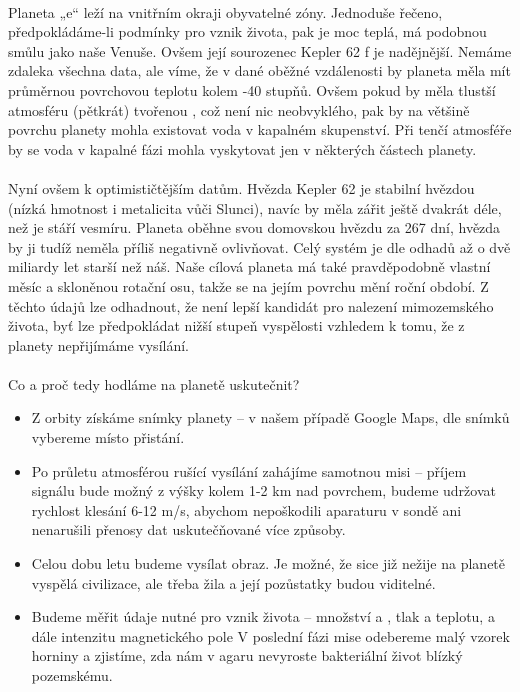 \documentclass[a4paper]{report}
\begin{document}
\paragraph{} Planeta „e“ leží na vnitřním okraji obyvatelné zóny. Jednoduše řečeno, předpokládáme-li podmínky pro vznik života, pak je moc teplá, má podobnou smůlu jako naše Venuše. Ovšem její sourozenec Kepler 62 f je nadějnější. Nemáme zdaleka všechna data, ale víme, že v dané oběžné vzdálenosti by planeta měla mít průměrnou povrchovou teplotu kolem -40 stupňů. Ovšem pokud by měla tlustší atmosféru (pětkrát) tvořenou , což není nic neobvyklého, pak by na většině povrchu planety mohla existovat voda v kapalném skupenství. Při tenčí atmosféře by se voda v kapalné fázi mohla vyskytovat jen v některých částech planety.
\paragraph{} Nyní ovšem k optimističtějším datům. Hvězda Kepler 62 je stabilní hvězdou (nízká hmotnost i metalicita vůči Slunci), navíc by měla zářit ještě dvakrát déle, než je stáří vesmíru. Planeta oběhne svou domovskou hvězdu za 267 dní, hvězda by ji tudíž neměla příliš negativně ovlivňovat. Celý systém je dle odhadů až o dvě miliardy let starší než náš. Naše cílová planeta má také pravděpodobně vlastní měsíc a skloněnou rotační osu, takže se na jejím povrchu mění roční období. Z těchto údajů lze odhadnout, že není lepší kandidát pro nalezení mimozemského života, byť lze předpokládat nižší stupeň vyspělosti vzhledem k tomu, že z planety nepřijímáme vysílání.
\paragraph{} Co a proč tedy hodláme na planetě uskutečnit?
\begin{itemize}
\item Z orbity získáme snímky planety – v našem případě Google Maps, dle snímků vybereme místo přistání.
\item Po průletu atmosférou rušící vysílání zahájíme samotnou misi – příjem signálu bude možný z výšky kolem 1-2 km nad povrchem, budeme udržovat rychlost klesání 6-12 m/s, abychom nepoškodili aparaturu v sondě ani nenarušili přenosy dat uskutečňované více způsoby.
\item Celou dobu letu budeme vysílat obraz. Je možné, že sice již nežije na planetě vyspělá civilizace, ale třeba žila a její pozůstatky budou viditelné.
\item Budeme měřit údaje nutné pro vznik života – množství  a , tlak a teplotu, a dále intenzitu magnetického pole
V poslední fázi mise odebereme malý vzorek horniny a zjistíme, zda nám v agaru nevyroste bakteriální život blízký pozemskému.
\end{itemize}
\end{document}
